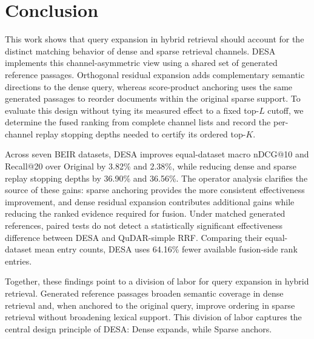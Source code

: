 \section{Conclusion}
\label{sec:conclusion}

This work shows that query expansion in hybrid retrieval should account for
the distinct matching behavior of dense and sparse retrieval channels. DESA implements
this channel-asymmetric view using a shared set of generated reference
passages. Orthogonal residual expansion adds complementary semantic directions
to the dense query, whereas score-product anchoring uses the same generated
passages to reorder documents within the original sparse support. To evaluate this design
without tying its measured effect to a fixed top-$L$ cutoff, we determine the
fused ranking from complete channel lists and record the per-channel replay
stopping depths needed to certify its ordered top-$K$.

Across seven BEIR datasets, DESA improves equal-dataset macro nDCG@10 and
Recall@20 over Original by 3.82\% and 2.38\%, while reducing dense and sparse
replay stopping depths by 36.90\% and 36.56\%. The operator analysis clarifies the source
of these gains: sparse anchoring provides the more consistent effectiveness
improvement, and dense residual expansion contributes additional gains while
reducing the ranked evidence required for fusion. Under matched generated
references, paired tests do not detect a statistically significant
effectiveness difference between DESA and QuDAR-simple RRF. Comparing their
equal-dataset mean entry counts, DESA uses 64.16\% fewer available fusion-side
rank entries.

Together, these findings point to a division of labor for query expansion in
hybrid retrieval. Generated reference passages broaden semantic coverage in dense
retrieval and, when anchored to the original query, improve ordering in sparse
retrieval without broadening lexical support. This division of labor captures
the central design principle of DESA: Dense expands, while Sparse anchors.
